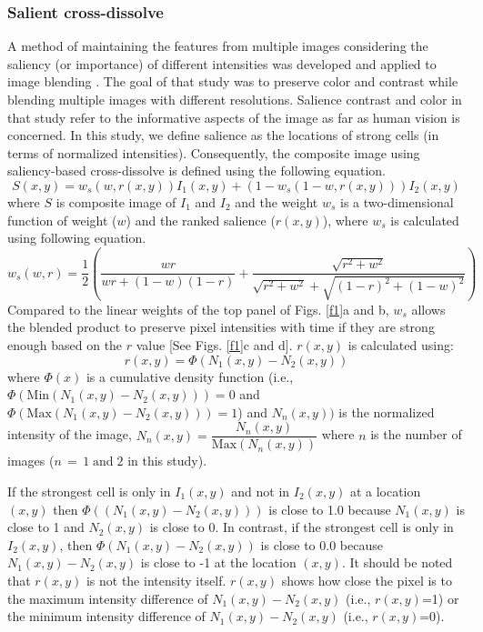 \documentclass[12pt]{article}
\begin{document}
\subsubsection{Salient cross-dissolve}
A method of maintaining the features from multiple images considering the saliency (or importance) of different intensities was developed and applied to image blending \citep{grund++06}. The goal of that study was to preserve color and contrast while blending multiple images with different resolutions. Salience contrast and color in that study refer to the informative aspects of the image as far as human vision is concerned. In this study, we define salience as the locations of strong cells (in terms of normalized intensities). Consequently, the composite image using saliency-based cross-dissolve is defined using the following equation.
\begin{equation}
S(x,y)=w_{s}(w,r(x,y))I_{1}(x,y)+(1-w_{s} (1-w,r(x,y)))I_{2}(x,y)
\end{equation}
where $S $ is composite image of $I_{1}$ and $I_{2}$ and the weight $w_{s}$ is a two-dimensional function of weight ($w$) and the ranked salience ($r(x,y)$), where $w_{s}$ is calculated using following equation. 
\begin{equation} 
w_{s}(w,r)=\dfrac{1}{2}(\dfrac{wr}{wr+(1-w)(1-r)}+\dfrac{\sqrt{r^2+w^2}}{\sqrt{r^2+w^2}+\sqrt{(1-r)^2+(1-w)^2}})
\end{equation}
Compared to the linear weights of the top panel of Figs. \ref{f1}a and b, $w_{s}$ allows the blended product to preserve pixel intensities with time if they are strong enough based on the $r$ value [See Figs. \ref{f1}c and d]. 
$r(x,y)$ is calculated using:
\begin{equation}
r(x,y)=\Phi(N_{1}(x,y)-N_{2}(x,y))
\end{equation} 
where $\Phi(x)$ is a cumulative density function (i.e., $\Phi(\text{Min}(N_{1}(x,y) -N_{2}(x,y)))=0$ and \newline $\Phi(\text{Max}(N_{1}(x,y) -N_{2}(x,y)))=1$) and $N_{n}(x,y)) $ is the normalized intensity of the image, $ N_{n}(x,y) =\dfrac{N_{n}(x,y)}{\text{Max}(N_{n}(x,y))}$ where $n$ is the number of images ($n\,= \,1 \; \text{and} \; 2$ in this study). 

If the strongest cell is only in $I_{1}(x,y)$ and not in $I_{2}(x,y)$ at a location $(x,y)$ then $\Phi((N_{1}(x,y) -N_{2}(x,y) ))$ is close to 1.0 because $N_{1}(x,y) $ is close to 1 and  $N_{2}(x,y) $ is close to 0. In contrast, if the strongest cell is only in $I_{2}(x,y)$, then $\Phi(N_{1}(x,y) -N_{2}(x,y))$ is close to 0.0 because $N_{1}(x,y) -N_{2}(x,y) $ is close to -1 at the location $(x,y)$. It should be noted that $r(x,y)$ is not the intensity itself. $r(x,y)$ shows how close the pixel is to the maximum intensity difference of $N_{1}(x,y)-N_{2}(x,y)$ (i.e., $r(x,y)$=1) or the minimum intensity difference of $N_{1}(x,y)-N_{2}(x,y)$ (i.e., $r(x,y)$=0).
\end{document}
